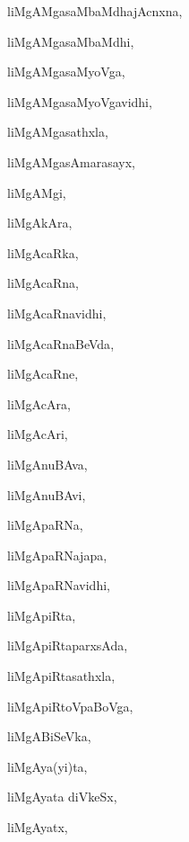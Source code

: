 \begin{multicols}{3}
{\noindent
{liMgAMgasaMbaMdhajAcnxna}, \pageref{liMgAMgasaMbaMdhajAcnxna}

\noindent
{liMgAMgasaMbaMdhi}, \pageref{liMgAMgasaMbaMdhi}

\noindent
{liMgAMgasaMyoVga}, \pageref{liMgAMgasaMyoVga}

\noindent
{liMgAMgasaMyoVgavidhi}, \pageref{liMgAMgasaMyoVgavidhi}

\noindent
{liMgAMgasathxla}, \pageref{liMgAMgasathxla}

\noindent
{liMgAMgasAmarasayx}, \pageref{liMgAMgasAmarasayx}

\noindent
{liMgAMgi}, \pageref{liMgAMgi}

\noindent
{liMgAkAra}, \pageref{liMgAkAra}

\noindent
{liMgAcaRka}, \pageref{liMgAcaRka}

\noindent
{liMgAcaRna}, \pageref{liMgAcaRna}

\noindent
{liMgAcaRnavidhi}, \pageref{liMgAcaRnavidhi}

\noindent
{liMgAcaRnaBeVda}, \pageref{liMgAcaRnaBeVda}

\noindent
{liMgAcaRne}, \pageref{liMgAcaRne}

\noindent
{liMgAcAra}, \pageref{liMgAcAra}

\noindent
{liMgAcAri}, \pageref{liMgAcAri}

\noindent
{liMgAnuBAva}, \pageref{liMgAnuBAva}

\noindent
{liMgAnuBAvi}, \pageref{liMgAnuBAvi}

\noindent
{liMgApaRNa}, \pageref{liMgApaRNa}

\noindent
{liMgApaRNajapa}, \pageref{liMgApaRNajapa}

\noindent
{liMgApaRNavidhi}, \pageref{liMgApaRNavidhi}

\noindent
{liMgApiRta}, \pageref{liMgApiRta}

\noindent
{liMgApiRtaparxsAda}, \pageref{liMgApiRtaparxsAda}

\noindent
{liMgApiRtasathxla}, \pageref{liMgApiRtasathxla}

\noindent
{liMgApiRtoVpaBoVga}, \pageref{liMgApiRtoVpaBoVga}

\noindent
{liMgABiSeVka}, \pageref{liMgABiSeVka}

\noindent
{liMgAya(yi)ta}, \pageref{liMgAyayita}

\noindent
{liMgAyata diVkeSx}, \pageref{liMgAyatadiVkeSx}

\noindent
{liMgAyatx}, \pageref{liMgAyatx}

}
\end{multicols}
